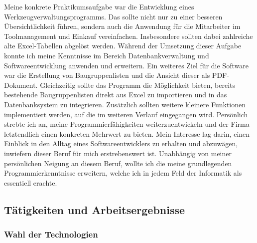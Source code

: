 \documentclass{Vorlage}
\begin{document}
Meine konkrete Praktikumsaufgabe war die Entwicklung eines 
Werkzeugverwaltungsprogramms. Das sollte nicht nur zu einer besseren 
Übersichtlichkeit führen, sondern auch die Anwendung für die Mitarbeiter im 
Toolmanagement und Einkauf vereinfachen. Insbesondere sollten dabei zahlreiche 
alte Excel-Tabellen abgelöst werden. Während der Umsetzung dieser Aufgabe konnte 
ich meine Kenntnisse im Bereich Datenbankverwaltung und Softwareentwicklung 
anwenden und erweitern. Ein weiteres Ziel für die Software war die 
Erstellung von Baugruppenlisten und die Ansicht dieser als PDF-Dokument. 
Gleichzeitig sollte das Programm die Möglichkeit
bieten, bereits bestehende Baugruppenlisten direkt aus Excel zu importieren und 
in das Datenbanksystem zu integrieren. Zusätzlich sollten weitere kleinere 
Funktionen implementiert werden, auf die im weiteren Verlauf eingegangen wird.
Persönlich strebte ich an, meine Programmierfähigkeiten weiterzuentwickeln 
und der Firma letztendlich einen konkreten Mehrwert zu bieten. 
Mein Interesse lag darin, einen Einblick in den Alltag eines
Softwareentwicklers zu erhalten und abzuwägen, inwiefern dieser Beruf für 
mich erstrebenswert ist. Unabhängig von meiner persönlichen Neigung an 
diesem Beruf, wollte ich die meine grundlegenden Programmierkenntnisse 
erweitern, welche ich in jedem Feld der Informatik als essentiell erachte.

\newpage

\subsection{Tätigkeiten und Arbeitsergebnisse}

\subsubsection{Wahl der Technologien}
\end{document}
